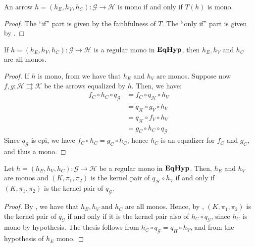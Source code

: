 \begin{corollary}\label{cor:mono1}
	An arrow $h = (h_E, h_V, h_C): \mathcal{G \to H}$ is mono if and only if $T(h)$ is mono.
\end{corollary}

\begin{proof}
	The ``if'' part is given by the faithfulness of $T$.
	The ``only if'' part is given by .
\end{proof}

\begin{corollary}\label{cor:mono2}
	If $h = (h_E, h_V, h_C): \mathcal{G\to H}$ is a regular mono in $\textbf{\textup{EqHyp}}$, then $h_E, h_V$ and $h_C$ are all monos.
\end{corollary}

\begin{proof}
	If $h$ is mono, from  we have that $h_E$ and $h_V$ are monos. Suppose now $f, g: \mathcal{H\rightrightarrows K}$ be the arrows equalized by $h$. Then, we have:
	\begin{align*} f_C \circ h_C \circ q_\mathcal{G} &= f_C\circ q_\mathcal{H} \circ h_V\\&=q_\mathcal{K}\circ g_V \circ h_V\\&=q_\mathcal{K}\circ f_V \circ h_V\\&=g_C \circ h_C \circ q_\mathcal{G} \end{align*}
	Since $q_\mathcal{G}$ is epi, we have $f_C \circ h_C = g_C \circ h_C$, hence $h_C$ is an equalizer for $f_C$ and $g_C$, and thus a mono.
\end{proof}

\begin{proposition}
	Let $h = (h_E, h_V, h_C): \mathcal{G \to H}$ be a regular mono in $\textbf{\textup{EqHyp}}$.
	Then, $h_E$ and $h_V$ are monos and $(K, \pi_1, \pi_2)$ is the kernel pair of $q_\mathcal{H}\circ h_V$ if and only if $(K, \pi_1, \pi_2)$ is the kernel pair of $q_\mathcal{G}$.
\end{proposition}

\begin{proof}
	By , we have that $h_E, h_V$ and $h_C$ are all monos.
	Hence, by , $(K, \pi_1, \pi_2)$ is the kernel pair of $q_\mathcal{G}$ if and only if it is the kernel pair also of $h_C \circ q_\mathcal{G}$, since $h_C$ is mono by hypothesis.
	The thesis follows from $h_C \circ q_\mathcal{G} = q_H \circ h_V$, and from the hypothesis of $h_E$ mono.
\end{proof}


